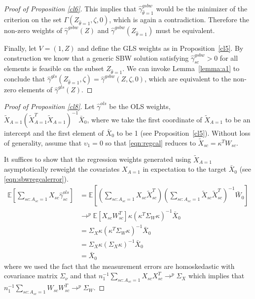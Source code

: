 \begin{proof}[Proof of Proposition \ref{cl6}]
This implies that $\hat{\gamma}^{gsbw}_{\hat{\theta} = 1}$ would be the minimizer of the criterion on the set $\Gamma(Z_{\hat{\theta} = 1}, \zeta, 0)$, which is again a contradiction. Therefore the non-zero weights of $\hat{\gamma}^{gsbw}(Z)$ and $\hat{\gamma}^{gsbw}(Z_{\hat{\theta} =1})$ must be equivalent.

Finally, let $V = (1, Z)$ and define the GLS weights as in Proposition~\ref{cl5}. By construction we know that a generic SBW solution satisfying $\hat{\gamma}_{sc}^{gsbw} > 0$ for all elements is feasible on the subset $Z_{\hat{\theta} = 1}$. We can invoke Lemma~\ref{lemma:a1} to conclude that $\hat{\gamma}^{gls}(Z_{\hat{\theta} = 1}, \zeta) = \hat{\gamma}^{gsbw}(Z, \zeta, 0)$, which are equivalent to the non-zero elements of $\hat{\gamma}^{gls}(Z)$. 
\end{proof}

\begin{proof}[Proof of Proposition \ref{cl8}]
    Let $\hat{\gamma}^{ols}$ be the OLS weights, $\tilde{X}_{A=1}(\tilde{X}_{A=1}^T\tilde{X}_{A=1})^{-1}\bar{X}_0$, where we take the first coordinate of $\tilde{X}_{A=1}$ to be an intercept and the first element of $\bar{X}_0$ to be 1 (see Proposition~\ref{cl5}).
    Without loss of generality, assume that $\upsilon_1 = 0$ so that \eqref{eqn:regcal} reduces to $\tilde{X}_{sc} = \kappa^TW_{sc}$.
    
    It suffices to show that the regression weights generated using $\tilde{X}_{A=1}$ asymptotically reweight the covariates $X_{A=1}$ in expectation to the target $\bar{X}_0$ (see \eqref{eqn:sbwregcalerror}).  
    \begin{align*}
        \mathbb{E}[\sum_{sc: A_{sc} = 1}X_{sc}\hat{\gamma}^{ols}_{sc}] &= \mathbb{E}[(\sum_{sc: A_{sc} = 1} X_{sc}\tilde{X}_{sc}^T)(\sum_{sc: A_{sc} = 1} \tilde{X}_{sc}\tilde{X}_{sc}^T)^{-1}\bar{W}_0] \\
        &\to^p \mathbb{E}[X_{sc}W_{sc}^T]\kappa(\kappa^T\Sigma_W\kappa)^{-1}\bar{X}_0 \\ 
        &= \Sigma_X\kappa(\kappa^T\Sigma_W\kappa)^{-1}\bar{X}_0 \\ 
        &= \Sigma_X\kappa(\Sigma_X\kappa)^{-1}\bar{X}_0 \\ 
        &= \bar{X}_0
    \end{align*}
    where we used the fact that the measurement errors are homoskedastic with covariance matrix $\Sigma_{\nu}$ and that $n_1^{-1}\sum_{sc: A_{sc} = 1}X_{sc}X_{sc}^T \to^p \Sigma_X$ which implies that $n_1^{-1}\sum_{sc: A_{sc} = 1}W_{sc}W_{sc}^T \to^p \Sigma_W$. 
\end{proof}


